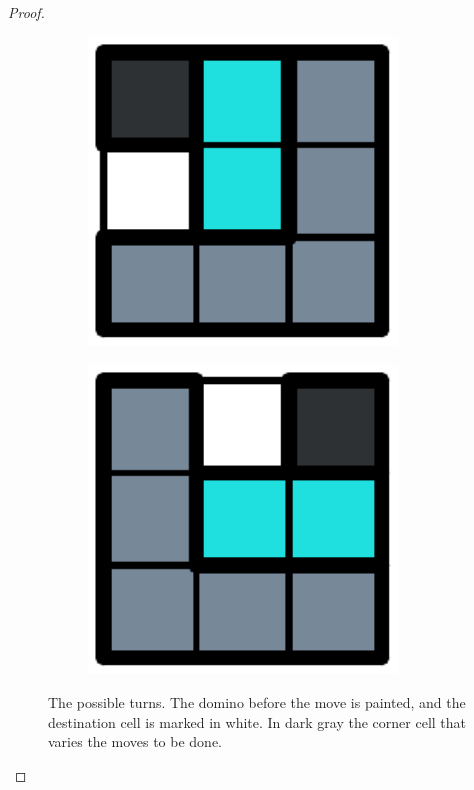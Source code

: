 \begin{proof}
\begin{figure}[h]
\begin{subfigure}[b]{0.1\textwidth}
    \caption{}
    \label{dom:turn6}
  \end{subfigure}
  \begin{subfigure}[b]{0.1\textwidth}
    \centering
    \includegraphics[width=0.9\textwidth]{pictures/dominoes/turns/turn_7.pdf}
    \caption{}
    \label{dom:turn7}
  \end{subfigure}
  \begin{subfigure}[b]{0.1\textwidth}
    \centering
    \includegraphics[width=0.9\textwidth]{pictures/dominoes/turns/turn_8.pdf}
    \caption{}
    \label{dom:turn8}
  \end{subfigure}
    \caption{The possible turns. The domino before the move is painted, and the destination cell is marked in white. In dark gray the corner cell that varies the moves to be done.} 
    \label{dom:turns} 
\end{figure}


\end{proof}
